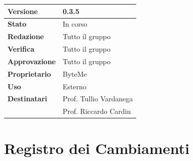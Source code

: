 \documentclass[11pt,a4paper]{article}
\begin{document}
\begin{titlepage}
    \begin{table}[H]
        \centering
        \begin{tabular}{|l|p{5cm}|}
            \hline
            \textbf{Versione} & 0.3.5 \\
            \hline
            \textbf{Stato} & In corso \\
            \hline
            \textbf{Redazione} & Tutto il gruppo \\
            \hline
            \textbf{Verifica} & Tutto il gruppo \\
            \hline
            \textbf{Approvazione} & Tutto il gruppo \\
            \hline
            \textbf{Proprietario} & ByteMe \\
            \hline
            \textbf{Uso} & Esterno \\
            \hline
            \textbf{Destinatari} & Prof. Tullio Vardanega \\ & Prof. Riccardo Cardin \\
            \hline
        \end{tabular}
    \end{table}
    
    \vfill
\end{titlepage}

\thispagestyle{empty}
\section*{Registro dei Cambiamenti}
\end{document}

